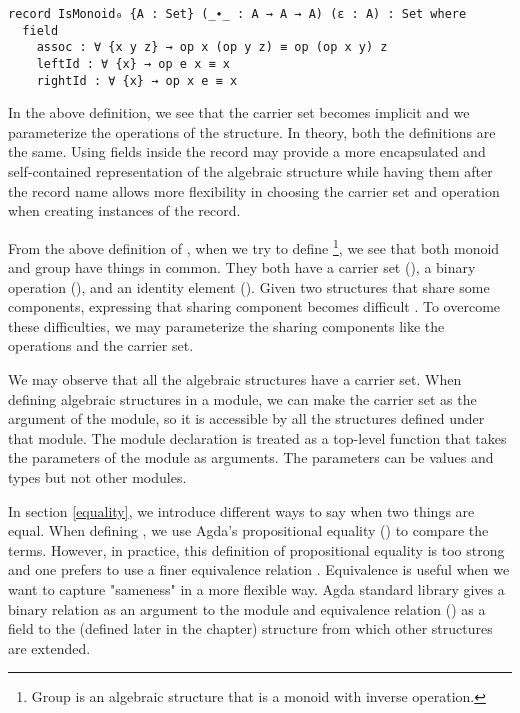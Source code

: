 \begin{verbatim}
record IsMonoid₀ {A : Set} (_∙_ : A → A → A) (ε : A) : Set where
  field
    assoc : ∀ {x y z} → op x (op y z) ≡ op (op x y) z
    leftId : ∀ {x} → op e x ≡ x
    rightId : ∀ {x} → op x e ≡ x 
\end{verbatim}

In the above definition, we see that the carrier set  becomes implicit
and we parameterize the operations of the structure. In theory, both the
definitions are the same. Using fields inside the record may provide a more
encapsulated and self-contained representation of the algebraic structure while
having them after the record name allows more flexibility in choosing the
carrier set and operation when creating instances of the record. 

From the above definition of , when we try to define
\footnote{Group is an algebraic structure that is a monoid with
inverse operation.}, we see that both monoid and group have things in common.
They both have a carrier set (), a binary operation (), and
an identity element (). Given two structures that share some
components, expressing that sharing component becomes difficult \cite{musa}. To
overcome these difficulties, we may parameterize the sharing components like the
operations and the carrier set.

We may observe that all the algebraic structures have a carrier set. When
defining algebraic structures in a module, we can make the carrier set as the
argument of the module, so it is accessible by all the structures defined under
that module. The module declaration is treated as a top-level function that takes
the parameters of the module as arguments. The parameters can be values and types
but not other modules.

In section \ref{equality}, we introduce different ways to say when two things
are equal. When defining , we use Agda's propositional equality
() to compare the terms. However, in practice, this definition of
propositional equality is too strong and one prefers to use a finer equivalence
relation \cite{musa}. Equivalence is useful when we want to capture "sameness"
in a more flexible way. Agda standard library gives a binary relation as an
argument to the module and equivalence relation () as a
field to the  (defined later in the chapter) structure from
which other structures are extended.
 
